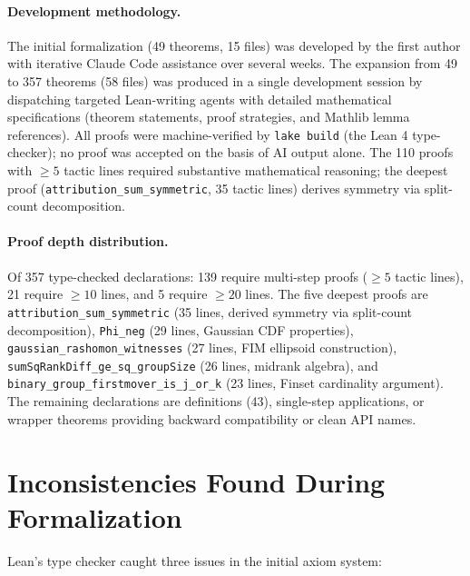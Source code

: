 \documentclass{article}
\begin{document}
\paragraph{Development methodology.}
The initial formalization (49 theorems, 15 files) was developed by
the first author with iterative Claude Code assistance over several
weeks. The expansion from 49 to 357 theorems (58 files) was produced
in a single development session by dispatching targeted Lean-writing
agents with detailed mathematical specifications (theorem statements,
proof strategies, and Mathlib lemma references). All proofs were
machine-verified by \texttt{lake build} (the Lean 4 type-checker);
no proof was accepted on the basis of AI output alone. The 110 proofs
with ${\geq}5$ tactic lines required substantive mathematical
reasoning; the deepest proof (\texttt{attribution\_sum\_symmetric},
35 tactic lines) derives symmetry via split-count decomposition.

\paragraph{Proof depth distribution.}
Of 357 type-checked declarations: 139 require multi-step proofs
(${\geq}5$ tactic lines), 21 require ${\geq}10$ lines, and 5
require ${\geq}20$ lines. The five deepest proofs are
\texttt{attribution\_sum\_symmetric} (35 lines, derived symmetry
via split-count decomposition), \texttt{Phi\_neg} (29 lines,
Gaussian CDF properties), \texttt{gaussian\_rashomon\_witnesses}
(27 lines, FIM ellipsoid construction),
\texttt{sumSqRankDiff\_ge\_sq\_groupSize} (26 lines, midrank
algebra), and \texttt{binary\_group\_firstmover\_is\_j\_or\_k}
(23 lines, Finset cardinality argument). The remaining declarations
are definitions (43), single-step applications, or wrapper theorems
providing backward compatibility or clean API names.

\section{Inconsistencies Found During Formalization}

Lean's type checker caught three issues in the initial axiom system:
\end{document}
